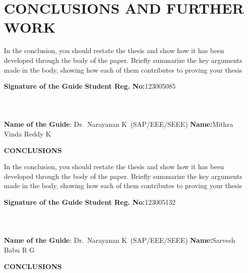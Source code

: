 	\chapter{CONCLUSIONS AND FURTHER WORK}
	\label{chap:conclusion}
	
	
	In the conclusion, you should restate the thesis and show how it has been developed through the body of the paper. Briefly summarize the key arguments made in the body, showing how each of them contributes to proving your thesis
	
	
	\vspace*{24pt}
	
	\noindent \textbf{Signature of the Guide} \hspace*{70mm} \textbf{Student Reg. No:}123005085\\
		\\
	\\
	\\
\noindent \textbf{Name of the Guide}:{ Dr.~Narayanan K}~(SAP/EEE/SEEE) \hspace*{7mm} \textbf{Name:}Mithra Vinda Reddy K
\pagebreak
	\pagebreak
	

	\begin{center}
		\Large{{\textbf{CONCLUSIONS}}}
	\end{center}
In the conclusion, you should restate the thesis and show how it has been developed through the body of the paper. Briefly summarize the key arguments made in the body, showing how each of them contributes to proving your thesis	
	
	
	\vspace*{24pt}
	
	\noindent \textbf{Signature of the Guide} \hspace*{70mm} \textbf{Student Reg. No:}123005132\\
		\\
	\\
	\\
\noindent \textbf{Name of the Guide}:{ Dr.~Narayanan K}~(SAP/EEE/SEEE) \hspace*{12.5 mm} \textbf{Name:}Sarvesh Babu R G
\pagebreak
	\pagebreak
	
	
	\begin{center}
		\Large{{\textbf{CONCLUSIONS}}}
	\end{center}
	
